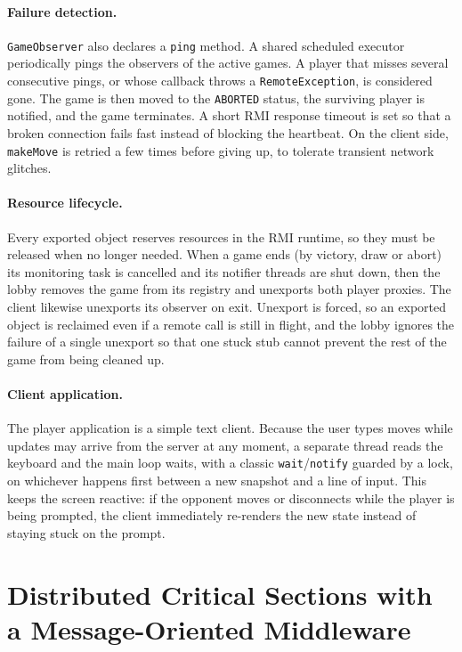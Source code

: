 \documentclass{scrartcl}
\begin{document}
\paragraph{Failure detection.} \texttt{GameObserver} also declares a \texttt{ping} method. A shared scheduled executor periodically pings the observers of the active games. A player that misses several consecutive pings, or whose callback throws a \texttt{RemoteException}, is considered gone. The game is then moved to the \texttt{ABORTED} status, the surviving player is notified, and the game terminates. A short RMI response timeout is set so that a broken connection fails fast instead of blocking the heartbeat. On the client side, \texttt{makeMove} is retried a few times before giving up, to tolerate transient network glitches.

\paragraph{Resource lifecycle.} Every exported object reserves resources in the RMI runtime, so they must be released when no longer needed. When a game ends (by victory, draw or abort) its monitoring task is cancelled and its notifier threads are shut down, then the lobby removes the game from its registry and unexports both player proxies. The client likewise unexports its observer on exit. Unexport is forced, so an exported object is reclaimed even if a remote call is still in flight, and the lobby ignores the failure of a single unexport so that one stuck stub cannot prevent the rest of the game from being cleaned up.

\paragraph{Client application.} The player application is a simple text client. Because the user types moves while updates may arrive from the server at any moment, a separate thread reads the keyboard and the main loop waits, with a classic \texttt{wait}/\texttt{notify} guarded by a lock, on whichever happens first between a new snapshot and a line of input. This keeps the screen reactive: if the opponent moves or disconnects while the player is being prompted, the client immediately re-renders the new state instead of staying stuck on the prompt.

\section{Distributed Critical Sections with a Message-Oriented Middleware}
\end{document}

